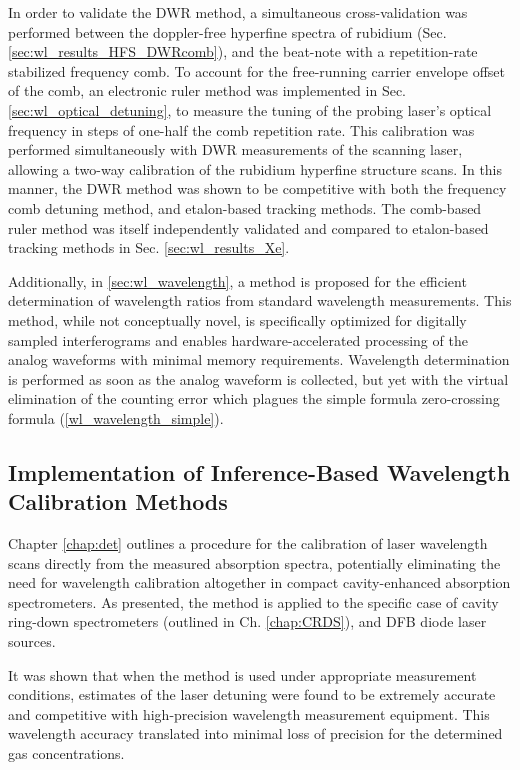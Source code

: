 \documentclass[8pt,a4paper]{report}
\begin{document}
	In order to validate the DWR method, a simultaneous cross-validation was performed between the doppler-free hyperfine spectra of rubidium (Sec. \ref{sec:wl_results_HFS_DWRcomb}), and the beat-note with a repetition-rate stabilized frequency comb. To account for the free-running carrier envelope offset of the comb, an electronic ruler method was implemented in Sec. \ref{sec:wl_optical_detuning}, to measure the tuning of the probing laser's optical frequency in steps of one-half the comb repetition rate. This calibration was performed simultaneously with DWR measurements of the scanning laser, allowing a two-way calibration of the rubidium hyperfine structure scans. In this manner, the DWR method was shown to be competitive with both the frequency comb detuning method, and etalon-based tracking methods. The comb-based ruler method was itself independently validated and compared to etalon-based tracking methods in Sec. \ref{sec:wl_results_Xe}.
	
	Additionally, in \ref{sec:wl_wavelength}, a method is proposed for the efficient determination of wavelength ratios from standard wavelength measurements. This method, while not conceptually novel, is specifically optimized for digitally sampled interferograms and enables hardware-accelerated processing of the analog waveforms with minimal memory requirements. Wavelength determination is performed as soon as the analog waveform is collected, but yet with the virtual elimination of the counting error which plagues the simple formula zero-crossing formula (\ref{wl_wavelength_simple}).
	
	\subsection{Implementation of Inference-Based Wavelength Calibration Methods}
	Chapter \ref{chap:det} outlines a procedure for the calibration of laser wavelength scans directly from the measured absorption spectra, potentially eliminating the need for wavelength calibration altogether in compact cavity-enhanced absorption spectrometers. As presented, the method is applied to the specific case of cavity ring-down spectrometers (outlined in Ch. \ref{chap:CRDS}), and DFB diode laser sources.
	
	It was shown that when the method is used under appropriate measurement conditions, estimates of the laser detuning were found to be extremely accurate and competitive with high-precision wavelength measurement equipment. This wavelength accuracy translated into minimal loss of precision for the determined gas concentrations.
	
\end{document}
